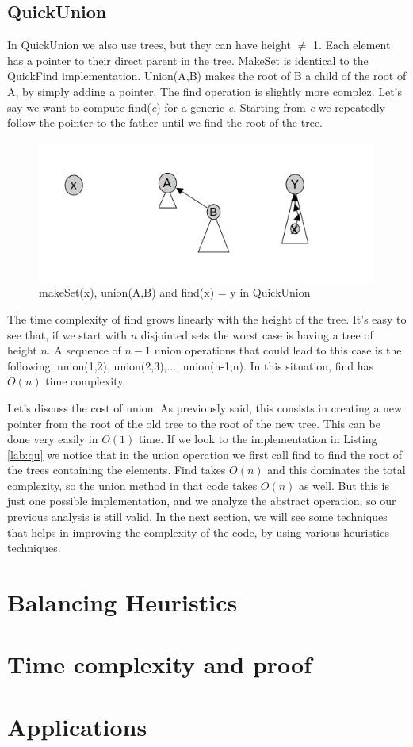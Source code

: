 \documentclass{article}
\begin{document}
\subsection{QuickUnion}
In QuickUnion we also use trees, but they can have height $\neq$ 1. Each element has a pointer to their
direct parent in the tree. MakeSet is identical to the QuickFind implementation. Union(A,B) makes the root of B a child of the 
root of A, by simply adding a pointer. The find operation is slightly more complez. Let's say
we want to compute find(\emph{e}) for a generic \emph{e}. Starting from \emph{e} we repeatedly 
follow the pointer to the father until we find the root of the tree.
\begin{figure}[h!]
    \includegraphics[width=\textwidth]  {img/uf.jpg}
    \caption{makeSet(x), union(A,B) and find(x) = y in QuickUnion}
    \label{fig:quickUnion}
\end{figure}
\newpage
The time complexity of find grows linearly with the height of the tree. It's easy to see
that, if we start with $n$ disjointed sets the worst case is having a tree of height $n$. A sequence
of $n-1$ union operations that could lead to this case is the following: union(1,2), union(2,3),..., union(n-1,n).
In this situation, find has $O(n)$ time complexity. 
\begin{center}
     
\end{center}
Let's discuss the cost of union. As previously said,
this consists in creating a new pointer from the root of the old tree to the root of the new tree. This can be done 
very easily in $O(1)$ time. If we look to the implementation in Listing \ref{lab:qu} we notice
that in the union operation we first call find to find the root of the trees containing the elements. Find takes $O(n)$ and this dominates the 
total complexity, so the union method in that code takes $ O(n)$ as well. But this is just one possible implementation, and we analyze
the abstract operation, so our previous analysis is still valid. 
In the next section, we will see some techniques that helps in improving the complexity of the code, by using various heuristics techniques.

\section{Balancing Heuristics}
\section{Time complexity and proof}
\section{Applications}


\end{document}
